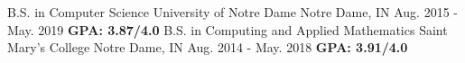 \begin{cventries}
  \cventry
    {B.S. in Computer Science}
    {University of Notre Dame}
    {Notre Dame, IN}
    {Aug. 2015 - May. 2019}
    {\textbf{GPA: 3.87/4.0}}
  \cventry
    {B.S. in Computing and Applied Mathematics}
    {Saint Mary's College}
    {Notre Dame, IN}
    {Aug. 2014 - May. 2018}
    {\textbf{GPA: 3.91/4.0}}
\end{cventries}
